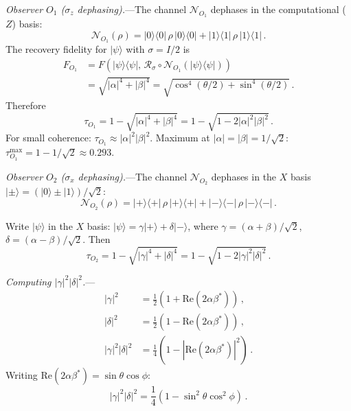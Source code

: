 \documentclass[aps,prd,preprint,superscriptaddress,longbibliography]{revtex4-2}
\newcommand{\Petz}{\mathcal{R}}
\newcommand{\chan}{\mathcal{N}}
\newcommand{\ket}[1]{|#1\rangle}
\newcommand{\bra}[1]{\langle#1|}
\newcommand{\tauasym}{\tau}
\begin{document}
\emph{Observer $O_1$ ($\sigma_z$ dephasing).}---The channel
$\chan_{O_1}$ dephases in the computational ($Z$) basis:
\begin{equation}
  \chan_{O_1}(\rho) = \ket{0}\!\bra{0}\,\rho\,\ket{0}\!\bra{0}
  + \ket{1}\!\bra{1}\,\rho\,\ket{1}\!\bra{1}\,.
  \label{eq:Z_dephasing}
\end{equation}
The recovery fidelity for $\ket{\psi}$ with $\sigma = I/2$ is
\begin{align}
  F_{O_1} &= F(\ket{\psi}\!\bra{\psi},\,
  \Petz_{\sigma}\circ\chan_{O_1}(\ket{\psi}\!\bra{\psi}))
  \nonumber\\
  &= \sqrt{|\alpha|^4 + |\beta|^4}
  = \sqrt{\cos^4(\theta/2) + \sin^4(\theta/2)}\,.
  \label{eq:F_Z}
\end{align}
Therefore
\begin{equation}
  \tauasym_{O_1} = 1 - \sqrt{|\alpha|^4 + |\beta|^4}
  = 1 - \sqrt{1 - 2|\alpha|^2|\beta|^2}\,.
  \label{eq:tau_Z}
\end{equation}
For small coherence: $\tauasym_{O_1} \approx |\alpha|^2|\beta|^2$.
Maximum at $|\alpha| = |\beta| = 1/\sqrt{2}$:
$\tauasym_{O_1}^{\max} = 1 - 1/\sqrt{2} \approx 0.293$.

\emph{Observer $O_2$ ($\sigma_x$ dephasing).}---The channel
$\chan_{O_2}$ dephases in the $X$ basis
$\ket{\pm} = (\ket{0} \pm \ket{1})/\sqrt{2}$:
\begin{equation}
  \chan_{O_2}(\rho) = \ket{+}\!\bra{+}\,\rho\,\ket{+}\!\bra{+}
  + \ket{-}\!\bra{-}\,\rho\,\ket{-}\!\bra{-}\,.
  \label{eq:X_dephasing}
\end{equation}

Write $\ket{\psi}$ in the $X$ basis:
$\ket{\psi} = \gamma\ket{+} + \delta\ket{-}$, where
$\gamma = (\alpha+\beta)/\sqrt{2}$, $\delta = (\alpha-\beta)/\sqrt{2}$.
Then
\begin{equation}
  \tauasym_{O_2} = 1 - \sqrt{|\gamma|^4 + |\delta|^4}
  = 1 - \sqrt{1 - 2|\gamma|^2|\delta|^2}\,.
  \label{eq:tau_X}
\end{equation}

\emph{Computing $|\gamma|^2|\delta|^2$.}---
\begin{align}
  |\gamma|^2 &= \frac{1}{2}(1 + \mathrm{Re}(2\alpha\beta^*))\,,
  \label{eq:gamma2}\\
  |\delta|^2 &= \frac{1}{2}(1 - \mathrm{Re}(2\alpha\beta^*))\,,
  \label{eq:delta2}\\
  |\gamma|^2|\delta|^2 &= \frac{1}{4}(1 - |\mathrm{Re}(2\alpha\beta^*)|^2)\,.
  \label{eq:gd}
\end{align}
Writing $\mathrm{Re}(2\alpha\beta^*) = \sin\theta\cos\phi$:
\begin{equation}
  |\gamma|^2|\delta|^2 = \frac{1}{4}(1 - \sin^2\theta\cos^2\phi)\,.
  \label{eq:gd_angles}
\end{equation}
\end{document}
